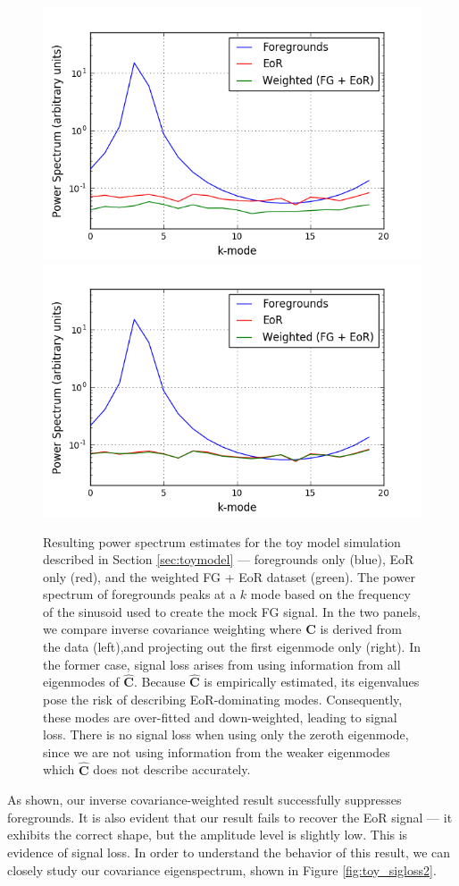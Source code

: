 \documentclass[preprint2,numberedappendix,tighten]{aastex6}  %
\begin{document}
\begin{figure}
	\centering
	\includegraphics[trim={0.3cm 0cm 1cm 0.3cm},clip,height=0.3\textwidth]{plots/toy_sigloss3.png}
	\includegraphics[trim={1cm 0cm 0cm 0.3cm},clip,height=0.3\textwidth]{plots/toy_sigloss4.png}
	\caption{Resulting power spectrum estimates for the toy model simulation described in Section \ref{sec:toymodel} --- 
foregrounds only (blue), EoR only (red), and the weighted FG + EoR dataset (green). The power spectrum of foregrounds peaks at a $k$ mode based on the frequency of the sinusoid used to create the mock FG signal. In the two panels, we compare inverse covariance weighting 
where $\textbf{C}$ is derived from the data (left),and projecting out the first eigenmode only (right). In the former 
case, signal loss arises from using information from all eigenmodes of $\hat{\textbf{C}}$. Because $\hat{\textbf{C}}$ is 
empirically estimated, its eigenvalues pose the risk of describing EoR-dominating modes. Consequently, these modes are over-fitted and down-weighted, leading to signal loss. 
There is no signal loss when using only the zeroth eigenmode, since we are not using information from the weaker eigenmodes 
which $\hat{\textbf{C}}$ does not describe accurately.}
	\label{fig:toy_sigloss3}
\end{figure}

As shown, our inverse covariance-weighted result successfully suppresses foregrounds. It is also evident that our result fails to 
recover the EoR signal --- it exhibits the correct shape, but the amplitude level is slightly low. This is evidence of signal loss. In 
order to understand the behavior of this result, we can closely study our covariance eigenspectrum, shown in Figure \ref{fig:toy_sigloss2}.
\end{document}
